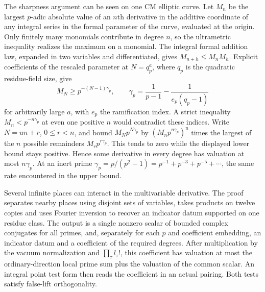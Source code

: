 The sharpness argument can be seen on one CM elliptic curve. Let $M_n$ be the largest $p$-adic absolute value of an $n$th derivative in the additive coordinate of any integral series in the formal parameter of the curve, evaluated at the origin. Only finitely many monomials contribute in degree $n$, so the ultrametric inequality realizes the maximum on a monomial. The integral formal addition law, expanded in two variables and differentiated, gives $M_{n+h}\le M_nM_h$. Explicit coefficients of the rescaled parameter at $N=q_p^a$, where $q_p$ is the quadratic residue-field size, give
\[
 M_N\ge p^{-(N-1)\gamma_p},\qquad
 \gamma_p=\frac{1}{p-1}-\frac1{e_p(q_p-1)}
\]
for arbitrarily large $a$, with $e_p$ the ramification index. A strict inequality $M_n<p^{-n\gamma_p}$ at even one positive $n$ would contradict these indices. Write $N=un+r$, $0\le r<n$, and bound $M_N p^{N\gamma_p}$ by $(M_np^{n\gamma_p})^u$ times the largest of the $n$ possible remainders $M_rp^{r\gamma_p}$. This tends to zero while the displayed lower bound stays positive. Hence some derivative in every degree has valuation at most $n\gamma_p$. At an inert prime $\gamma_p=p/(p^2-1)=p^{-1}+p^{-3}+p^{-5}+\cdots$, the same rate encountered in the upper bound.

Several infinite places can interact in the multivariable derivative. The proof separates nearby places using disjoint sets of variables, takes products on twelve copies and uses Fourier inversion to recover an indicator datum supported on one residue class. The output is a single nonzero scalar of bounded complex conjugates for all primes, and, separately for each $p$ and coefficient embedding, an indicator datum and a coefficient of the required degrees. After multiplication by the vacuum normalization and $\prod_\tau l_\tau!$, this coefficient has valuation at most the ordinary-direction local prime sum plus the valuation of the common scalar. An integral point test form then reads the coefficient in an actual pairing. Both tests satisfy false-lift orthogonality.

